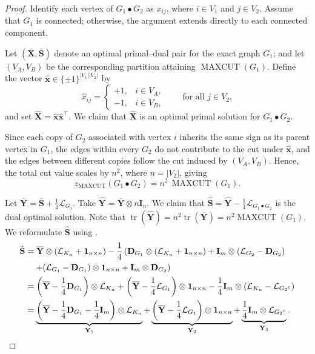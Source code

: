 \documentclass[a4paper,fleqn]{cas-sc}
\newcommand{\X}{\mathbf{X}}
\renewcommand{\L}{\mathcal{L}}
\newcommand{\I}{\mathbf{I}}
\newcommand{\1}{\mathbf{1}}
\newcommand{\x}{\mathbf{x}}
\DeclareMathOperator{\mc}{MAXCUT}
\newcommand{\bS}{\mathbf{S}}
\newcommand{\Y}{\mathbf{Y}}
\DeclareMathOperator{\tr}{tr}
\begin{document}
\begin{proof}

Identify each vertex of \( G_1 \bullet G_2 \) as \( x_{ij} \), where \( i \in V_1 \) and \( j \in V_2 \).
Assume that \( G_1 \) is connected; otherwise, the argument extends directly to each connected component.

Let \((\overline{\X}, \overline{\bS})\) denote an optimal primal–dual pair for the exact graph \( G_1 \); and let \((V_A, V_B)\) be the corresponding partition attaining \(\mc(G_1)\).
Define the vector \(\hat{\x} \in \{\pm 1\}^{|V_1||V_2|}\) by
\[
\hat{x}_{ij} =
\begin{cases}
+1, & i \in V_A, \\[3pt]
-1, & i \in V_B,
\end{cases}
\qquad \text{for all } j \in V_2,
\]
and set \(\hat{\X} = \hat{\x}\hat{\x}^\top.\)
We claim that \(\hat{\X}\) is an optimal primal solution for \( G_1 \bullet G_2 \).

Since each copy of \( G_2 \) associated with vertex \( i \) inherits the same sign as its parent vertex in \( G_1 \), 
the edges within every \( G_2 \) do not contribute to the cut under \(\hat{\x}\), and the edges between different copies follow the cut induced by \((V_A, V_B)\).
Hence, the total cut value scales by \( n^2 \), where \( n = |V_2| \), giving
\[
z_{\mathrm{MAXCUT}}(G_1 \bullet G_2) = n^2 \, \mc(G_1).
\]
    
    Let $\overline{\Y} = \overline{\bS} + \frac{1}{4} \L_{G_1}$. Take $\hat{\Y} = \overline{\Y} \otimes n \I_n$. We claim that $\hat{\bS} = \hat{\Y} - \frac{1}{4}\L_{G_1 \bullet G_2}$ is the dual optimal solution. Note that $\tr(\hat{\Y}) = n^2 \tr(\overline{\Y}) = n^2 \mc(G_1)$. We reformulate $\hat{\bS}$ using .
\begin{align*}
    \hat{\bS} &= \overline{\Y} \otimes (\L_{K_n} + \1_{n \times n})  
    - \frac{1}{4} \left(\mathbf{D}_{G_1} \otimes (\L_{K_n} + \1_{n \times n})  
    + \I_m \otimes (\L_{G_2} - \mathbf{D}_{G_2})\right. \notag \\
    &\left.\quad + (\L_{G_1} - \mathbf{D}_{G_1}) \otimes \1_{n \times n}  
    + \I_m \otimes \mathbf{D}_{G_2}  
    \right) \\
    &= \left(\overline{\Y} - \frac{1}{4}\mathbf{D}_{G_1} \right) \otimes \L_{K_n}  
    + \left(\overline{\Y} - \frac{1}{4} \L_{G_1}\right) \otimes \1_{n \times n}  
     - \frac{1}{4} \I_m \otimes (\L_{K_n} - \L_{{G_2}^c})\\
    &= \underbrace{\left(\overline{\Y} - \frac{1}{4}\mathbf{D}_{G_1}-\frac{1}{4}\I_m\right) \otimes \L_{K_n}}_{\Y_1}  
    + \underbrace{\left(\overline{\Y} - \frac{1}{4} \L_{G_1}\right) \otimes \1_{n \times n}}_{\Y_2}  
    + \underbrace{\frac{1}{4} \I_m \otimes \L_{{G_2}^c}}_{\Y_3}.
\end{align*}


\end{proof}
\end{document}
